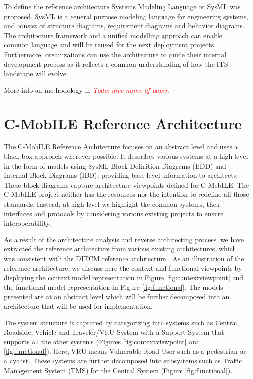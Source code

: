 \documentclass[conference]{IEEEtran}
\newcommand{\todo}[1]{\textcolor{red}{\emph{Todo: #1}}}
\begin{document}
To define the reference architecture Systems Modeling Language or SysML was proposed. SysML is a general purpose modeling language for engineering systems, and consist of structure diagrams, requirement diagrams and behavior diagrams. The architecture framework and a unified modelling approach can enable common language and will be reused for the next deployment projects. Furthermore, organizations can use the architecture to guide their internal development process as it reflects a common understanding of how the ITS landscape will evolve.

More info on methodology in \todo{give name of paper}.

\section{C-MobILE Reference Architecture}
\label{secCMobILEReferenceArchitecture}

The C-MobILE Reference Architecture focuses on an abstract level and uses a black box approach wherever possible.
It describes various systems at a high level in the form of models using SysML Block Definition Diagrams (BDD) and Internal Block Diagrams (IBD), providing base level information to architects. These block diagrams capture architecture viewpoints defined for C-MobILE. 
The C-MobILE project neither has the resources nor the intention to redefine all those standards.
Instead, at high level we highlight the common systems, their interfaces and protocols by considering various existing projects to ensure interoperability.

As a result of the architecture analysis and reverse architecting process, we have extracted the reference architecture from various existing architectures, which was consistent with the DITCM reference architecture \cite{ditcm}\cite{ditcmits}. As an illustration of the reference architecture, we discuss here the context and functional viewpoints by displaying the context model representation in Figure \ref{fig:contextviewpoint} and the functional model representation in Figure \ref{fig:functional}. The models presented are at an abstract level which will be further decomposed into an architecture that will be used for implementation.

The system structure is captured by categorizing into systems such as Central, Roadside, Vehicle and Traveler/VRU System with a Support System that supports all the other systems (Figures \ref{fig:contextviewpoint} and \ref{fig:functional}). Here, VRU means Vulnerable Road User such as a pedestrian or a cyclist. These systems are further decomposed into subsystems such as Traffic Management System (TMS) for the Central System (Figure \ref{fig:functional}).
\end{document}
